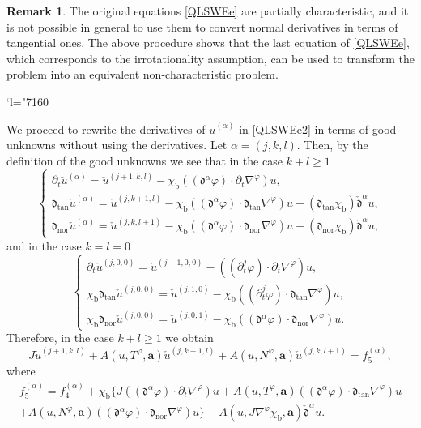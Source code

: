 \documentclass[10pt]{amsart}
\newcommand{\Changel}{\mathcode`l="7160}
\newcommand{\dtan}{{\mathfrak d}_\mathrm{tan}}
\newcommand{\dnor}{{\mathfrak d}_\mathrm{nor}}
\newcommand{\dt}{\partial_t}
\newcommand{\cmfalpha}{\check{\mathfrak{d}}^{\alpha}}
\theoremstyle{definition}
\newtheorem{remark}[theorem]{Remark}
\begin{document}
\begin{remark}
The original equations \eqref{QLSWEe} are partially characteristic,
and it is not possible in general to use them to convert normal derivatives in terms of tangential ones.
The above procedure shows that the last equation of \eqref{QLSWEe}, which corresponds to the irrotationality assumption,
can be used to transform the problem into an equivalent non-characteristic problem.
\end{remark}

\Changel

We proceed to rewrite the derivatives of $\check{u}^{(\alpha)}$ in \eqref{QLSWEe2} in terms of good unknowns without using the derivatives.
Let $\alpha=(j,k,l)$.
Then, by the definition of the good unknowns we see that in the case $k+l\geq1$
\begin{equation}\label{DGU1}
\begin{cases}
\dt\check{u}^{(\alpha)} = \check{u}^{(j+1,k,l)} - \chi_\mathrm{b}((\mathfrak{d}^\alpha\varphi)\cdot\dt\nabla^\varphi)u, \\
\dtan\check{u}^{(\alpha)} = \check{u}^{(j,k+1,l)} - \chi_\mathrm{b}((\mathfrak{d}^\alpha\varphi)\cdot\dtan\nabla^\varphi)u
+ (\dtan\chi_\mathrm{b}) \cmfalpha u, \\
\dnor\check{u}^{(\alpha)} = \check{u}^{(j,k,l+1)} - \chi_\mathrm{b}((\mathfrak{d}^\alpha\varphi)\cdot\dnor\nabla^\varphi)u
+ (\dnor\chi_\mathrm{b}) \cmfalpha u,
\end{cases}
\end{equation}
and in the case $k=l=0$
\begin{equation}\label{DGU2}
\begin{cases}
\dt\check{u}^{(j,0,0)} = \check{u}^{(j+1,0,0)} - ((\dt^j\varphi)\cdot\dt\nabla^\varphi)u, \\
\chi_\mathrm{b}\dtan\check{u}^{(j,0,0)} = \check{u}^{(j,1,0)} - \chi_\mathrm{b}((\dt^j\varphi)\cdot\dtan\nabla^\varphi)u, \\
\chi_\mathrm{b}\dnor\check{u}^{(j,0,0)} = \check{u}^{(j,0,1)} - \chi_\mathrm{b}((\mathfrak{d}^\alpha\varphi)\cdot\dnor\nabla^\varphi)u.
\end{cases}
\end{equation}
Therefore, in the case $k+l\geq1$ we obtain
\begin{equation}\label{QLSWEe3}
J\check{u}^{(j+1,k,l)}+A(u,T^\varphi,\bm{a})\check{u}^{(j,k+1,l)}+A(u,N^\varphi,\bm{a})\check{u}^{(j,k,l+1)}=f_5^{(\alpha)},
\end{equation}
where
\begin{multline*}
f_5^{(\alpha)}
= f_4^{(\alpha)} + \chi_\mathrm{b} \{ J((\mathfrak{d}^\alpha\varphi)\cdot\dt\nabla^\varphi)u
+ A(u,T^\varphi,\bm{a})((\mathfrak{d}^\alpha\varphi)\cdot\dtan\nabla^\varphi)u \\
+ A(u,N^\varphi,\bm{a})((\mathfrak{d}^\alpha\varphi)\cdot\dnor\nabla^\varphi)u \}
- A(u,J\nabla^\varphi\chi_\mathrm{b},\bm{a}) \cmfalpha u.
\end{multline*}
\end{document}
